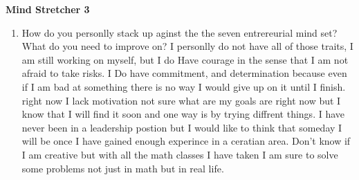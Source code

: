 \documentclass{article}
\begin{document}
\textbf{ Mind Stretcher 3}
\begin{enumerate}
\item How do you personlly stack up aginst the the seven entrereurial  mind set? What do you need to improve on?
I personlly do not have all of those traits, I am still working on myself, but I do Have courage in the sense that I am not afraid to take risks. I Do have commitment, and determination because even if I am bad at something there is no way I would give up on it until I finish. right now I lack motivation not sure what are my goals are right now but I know that I will find it soon and one way is by trying diffrent things. I have never been in a leadership postion but I would like to think that someday I will be once I have gained enough experince in a ceratian area.  Don't know if I am creative but with all the math classes I have taken I am sure to solve some problems not just in math but in real life. 

\end{enumerate}
\end{document}
